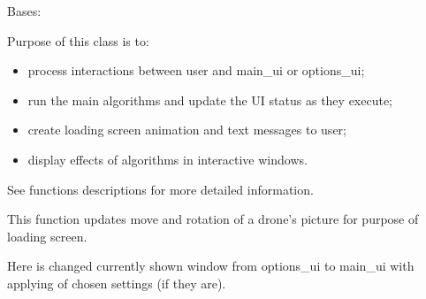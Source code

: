 \documentclass[letterpaper,10pt,english]{sphinxmanual}
\begin{document}
\begin{fulllineitems}
\label{\detokenize{main:main.MainWindow}}
\pysigstartsignatures
{}
\pysigstopsignatures
\sphinxAtStartPar
Bases: 

\sphinxAtStartPar
Purpose of this class is to:
\begin{itemize}
\item {} 
\sphinxAtStartPar
process interactions between user and main\_ui or options\_ui;

\item {} 
\sphinxAtStartPar
run the main algorithms and update the UI status as they execute;

\item {} 
\sphinxAtStartPar
create loading screen animation and text messages to user;

\item {} 
\sphinxAtStartPar
display effects of algorithms in interactive windows.

\end{itemize}

\sphinxAtStartPar
See functions descriptions for more detailed information.

\begin{fulllineitems}
\label{\detokenize{main:main.MainWindow.animate_drone}}
\pysigstartsignatures
{}
\pysigstopsignatures
\sphinxAtStartPar
This function updates move and rotation of a drone’s picture for purpose of loading screen.

\end{fulllineitems}


\begin{fulllineitems}
\label{\detokenize{main:main.MainWindow.apply_options}}
\pysigstartsignatures
{}
\pysigstopsignatures
\sphinxAtStartPar
Here is changed currently shown window from options\_ui to main\_ui with applying of chosen settings (if they
are).


\end{fulllineitems}
\end{fulllineitems}
\end{document}
